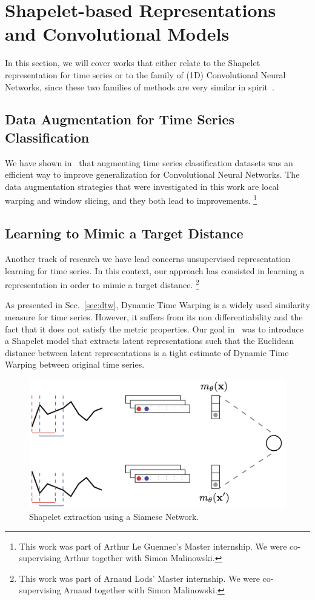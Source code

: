 \section{Shapelet-based Representations and Convolutional Models}
\label{sec:cnn}

In this section, we will cover works that either relate to the Shapelet
representation for time series or to the family of (1D) Convolutional Neural
Networks, since these two families of methods are very similar in
spirit~\cite{lods:hal-01565207}.

\subsection{Data Augmentation for Time Series Classification}

We have shown in~\cite{leguennec:halshs-01357973} that augmenting time
series classification datasets was an efficient way to improve generalization
for Convolutional Neural Networks.
The data augmentation strategies that were investigated in this work are
local warping and window slicing, and they both lead to improvements.%
\footnote{This work was part of Arthur Le Guennec's Master internship.
We were co-supervising Arthur together with Simon Malinowski.}

\subsection{Learning to Mimic a Target Distance}
\label{sec:siamese}

Another track of research we have lead concerns unsupervised representation
learning for time series.
In this context, our approach has consisted in learning a representation in
order to mimic a target distance.%
\footnote{This work was part of Arnaud Lods' Master internship.
We were co-supervising Arnaud together with Simon Malinowski.}

As presented in Sec.~\ref{sec:dtw}, Dynamic Time Warping is a widely
used similarity measure for time series.
However, it suffers from its non differentiability and the fact that it does
not satisfy the metric properties.
Our goal in~\cite{lods:hal-01565207} was to introduce a Shapelet model that
extracts latent representations such that the Euclidean distance between latent
representations is a tight estimate of Dynamic Time Warping between original
time series.

\begin{figure}[t]
\centering
\includegraphics[width=.8\textwidth]{fig/siamese_ldps}
\caption{Shapelet extraction using a Siamese Network. \label{fig:siamese}}
\end{figure}

